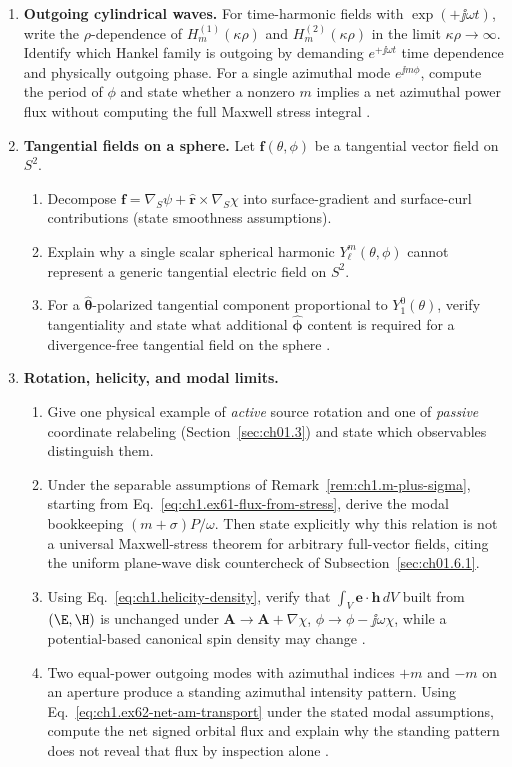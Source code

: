 \begin{enumerate}
\item \textbf{Outgoing cylindrical waves.}
For time-harmonic fields with $\exp(+\jj\omega t)$, write the $\rho$-dependence of $H_m^{(1)}(\kappa\rho)$ and $H_m^{(2)}(\kappa\rho)$ in the limit $\kappa\rho\to\infty$. Identify which Hankel family is outgoing by demanding $e^{+\jj\omega t}$ time dependence and physically outgoing phase. For a single azimuthal mode $e^{\jj m\phi}$, compute the period of $\phi$ and state whether a nonzero $m$ implies a net azimuthal power flux without computing the full Maxwell stress integral \cite{stratton1941,harrington2001}.

\item \textbf{Tangential fields on a sphere.}
Let $\mathbf{f}(\theta,\phi)$ be a tangential vector field on $S^2$.
\begin{enumerate}[label=(\alph*)]
\item Decompose $\mathbf{f}=\nabla_S\psi+\hat{\mathbf{r}}\times\nabla_S\chi$ into surface-gradient and surface-curl contributions (state smoothness assumptions).
\item Explain why a single scalar spherical harmonic $Y_\ell^m(\theta,\phi)$ cannot represent a generic tangential electric field on $S^2$.
\item For a $\hat{\boldsymbol\theta}$-polarized tangential component proportional to $Y_1^0(\theta)$, verify tangentiality and state what additional $\hat{\boldsymbol\phi}$ content is required for a divergence-free tangential field on the sphere \cite{stratton1941,hansen1988}.
\end{enumerate}

\item \textbf{Rotation, helicity, and modal limits.}
\begin{enumerate}[label=(\alph*)]
\item Give one physical example of \emph{active} source rotation and one of \emph{passive} coordinate relabeling (Section~\ref{sec:ch01.3}) and state which observables distinguish them.
\item Under the separable assumptions of Remark~\ref{rem:ch1.m-plus-sigma}, starting from Eq.~\eqref{eq:ch1.ex61-flux-from-stress}, derive the modal bookkeeping $(m+\sigma)P/\omega$. Then state explicitly why this relation is not a universal Maxwell-stress theorem for arbitrary full-vector fields, citing the uniform plane-wave disk countercheck of Subsection~\ref{sec:ch01.6.1}.
\item Using Eq.~\eqref{eq:ch1.helicity-density}, verify that $\int_V \mathbf{e}\cdot\mathbf{h}\,dV$ built from $(\E,\H)$ is unchanged under $\mathbf{A}\to\mathbf{A}+\nabla\chi$, $\phi\to\phi-\jj\omega\chi$, while a potential-based canonical spin density may change \cite{belinfante1940,jackson1999}.
\item Two equal-power outgoing modes with azimuthal indices $+m$ and $-m$ on an aperture produce a standing azimuthal intensity pattern. Using Eq.~\eqref{eq:ch1.ex62-net-am-transport} under the stated modal assumptions, compute the net signed orbital flux and explain why the standing pattern does not reveal that flux by inspection alone \cite{allen1992,beth1936}.
\end{enumerate}


\end{enumerate}

